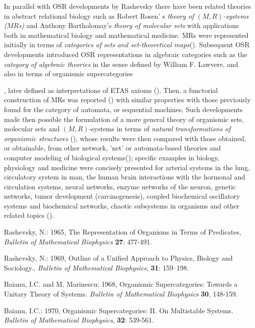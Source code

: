 \documentclass[12pt]{article}
\theoremstyle{plain}
\theoremstyle{definition}
\numberwithin{equation}{section}
\begin{document}
In parallel with OSR developments by Rashevsky there have been related theories in abstract relational biology such as Robert Rosen' s {\em theory of \textbf{$(M,R)$}-systems ($MR$s)} and Anthony Bartholomay's 
{\em theory of molecular sets} with applications both in mathematical biology and mathematical medicine. MRs were represented initially in terms of {\em categories of sets and set-theoretical maps}(\cite{RRosen1, RRosen2}). Subsequent OSR developments introduced OSR representations in algebraic categories such as the {\em category of algebraic theories} in the sense defined by William F. Lawvere, and also in terms of organismic supercategories {\cite{ICBM68}, later defined as interpretations of ETAS axioms (\cite{ICB70}). Then, a functorial construction of MRs was reported (\cite{ICB73, ICBM74}) with similar properties with those previously found for the category of automata, or sequential machines. Such developments made then possible the formulation of a more general theory of organismic sets, molecular sets and \textbf{$(M,R)$}-systems in terms of {\em natural transformations of organismic structures} (\cite{ICB80}), whose results were then compared with those obtained, or obtainable, from other network, 'net' or automata-based theories and computer modeling of biological systems(\cite{ICB87a}); specific examples in biology, physiology and medicine were concisely presented for arterial systems in the lung, circulatory system in man, the human brain interactions with the hormonal and circulation systems, neural networks, enzyme networks of the neuron, genetic networks, tumor development (carcinogenesis), coupled biochemical oscillatory systems and biochemical networks,
chaotic subsystems in organisms and other related topics (\cite{ICB87a, ICB87b}).


\begin{thebibliography}{9}

Rashevsky, N.: 1965, The Representation of Organisms in Terms of
Predicates, \emph{Bulletin of Mathematical Biophysics} \textbf{27}: 477-491.

Rashevsky, N.: 1969, Outline of a Unified Approach to Physics, Biology and Sociology., \emph{Bulletin of Mathematical Biophysics}, \textbf{31}: 159--198.


Baianu, I.C. and M. Marinescu: 1968, Organismic Supercategories: Towards a Unitary Theory of Systems. \emph{Bulletin of Mathematical Biophysics} \textbf{30}, 148-159.

Baianu, I.C.: 1970, Organismic Supercategories: II. On Multistable Systems. \emph{Bulletin of Mathematical Biophysics}, \textbf{32}: 539-561.


\end{thebibliography}}
\end{document}
